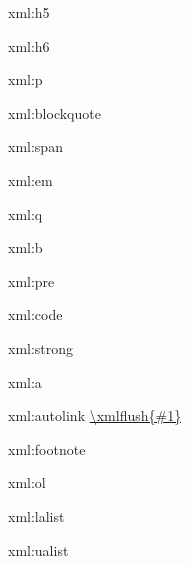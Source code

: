\startxmlsetups xml:h5
\stopxmlsetups

\startxmlsetups xml:h6
\stopxmlsetups

\startxmlsetups xml:p
    \par
\stopxmlsetups

\startxmlsetups xml:blockquote
    \startnarrow{}\stopnarrow
\stopxmlsetups

\startxmlsetups xml:span
   \begingroup{}\endgroup
\stopxmlsetups

\startxmlsetups xml:em
    \begingroup\em {}\endgroup
\stopxmlsetups

\startxmlsetups xml:q
\stopxmlsetups

\startxmlsetups xml:b
    \begingroup\bf{}\endgroup
\stopxmlsetups

\startxmlsetups xml:pre
    \par
\stopxmlsetups

\startxmlsetups xml:code
    \begingroup\tt{}\endgroup
\stopxmlsetups

\startxmlsetups xml:strong
    \begingroup\bf{}\endgroup
\stopxmlsetups

\startxmlsetups xml:a
    \href{\xmlatt{#1}{href}}{}
\stopxmlsetups

\startxmlsetups xml:autolink
    \url{\xmlflush{#1}}
\stopxmlsetups

\startxmlsetups xml:footnote
    \startfootnote
    \stopfootnote
\stopxmlsetups

\startxmlsetups xml:ol
    {\startitemize[n][start=\xmlatt{#1}{start}]
    \stopitemize}
    {\startitemize[n]
    \stopitemize}
\stopxmlsetups

\startxmlsetups xml:lalist
    {\startitemize[a][start=\xmlatt{#1}{start}]
    \stopitemize}
    {\startitemize[a]
    \stopitemize}
\stopxmlsetups

\startxmlsetups xml:ualist
    {\startitemize[A][start=\xmlatt{#1}{start}]
    \stopitemize}
    {\startitemize[A]
    \stopitemize}
\stopxmlsetups

